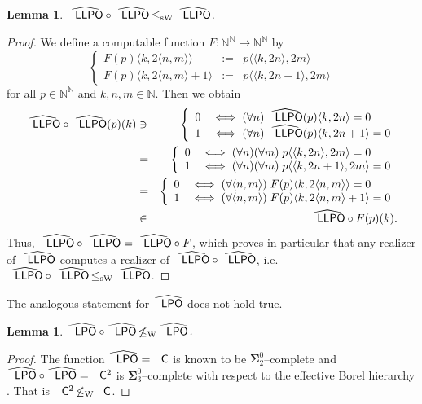 \documentclass[jsl,10pt]{noasl}
\def\IN{{\mathbb{N}}}
\newcommand{\SO}[1]{{{\boldsymbol\Sigma}^0_{#1}}}
\def\LPO{\text{\rm\sffamily LPO}}
\def\LLPO{\text{\rm\sffamily LLPO}}
\def\C{\text{\rm\sffamily C}}
\def\LPO{\text{\rm\sffamily LPO}}
\def\LLPO{\text{\rm\sffamily LLPO}}
\def\leqSW{\mathop{\leq_{\mathrm{sW}}}}
\def\nleqW{\mathop{\not\leq_{\mathrm{W}}}}
\newtheorem{lemma}[proposition]{Lemma}
\begin{document}
\begin{lemma} 
\label{lem:LLPO-double}
$\widehat{\LLPO}\circ\widehat{\LLPO}\leqSW\widehat{\LLPO}$.
\end{lemma}
\begin{proof}
We define a computable function $F:\IN^\IN\to\IN^\IN$ by
\[\left\{\begin{array}{lcl}
F(p)\langle k,2\langle n,m\rangle\rangle &:=& p\langle\langle k,2n\rangle,2m\rangle\\
F(p)\langle k,2\langle n,m\rangle+1\rangle &:=& p\langle\langle k,2n+1\rangle,2m\rangle
\end{array}\right.\]
for all $p\in\IN^\IN$ and $k,n,m\in\IN$. Then we obtain
\begin{eqnarray*}
\widehat{\LLPO}\circ\widehat{\LLPO}(p)(k)
&\ni& \left\{\begin{array}{ll}
    0 & \iff(\forall n)\;\widehat{\LLPO}(p)\langle k,2n\rangle=0\\
    1 & \iff(\forall n)\;\widehat{\LLPO}(p)\langle k,2n+1\rangle=0
    \end{array}\right.\\
&=& \left\{\begin{array}{ll}
    0 & \iff(\forall n)(\forall m)\;p\langle\langle k,2n\rangle,2m\rangle=0\\
    1 & \iff(\forall n)(\forall m)\;p\langle\langle k,2n+1\rangle,2m\rangle=0
    \end{array}\right.\\
&=& \left\{\begin{array}{ll}
    0 & \iff(\forall\langle n,m\rangle)\;F(p)\langle k,2\langle n,m\rangle\rangle=0\\
    1 & \iff(\forall\langle n,m\rangle)\;F(p)\langle k,2\langle n,m\rangle+1\rangle=0\\
    \end{array}\right.\\
&\in& \widehat{\LLPO}\circ F(p)(k).        
\end{eqnarray*}
Thus, $\widehat{\LLPO}\circ\widehat{\LLPO}=\widehat{\LLPO}\circ F$, which proves
in particular that any realizer of $\widehat{\LLPO}$ computes a realizer 
of $\widehat{\LLPO}\circ\widehat{\LLPO}$, i.e.\ $\widehat{\LLPO}\circ\widehat{\LLPO}\leqSW\widehat{\LLPO}$.
\end{proof}

The analogous statement for $\widehat{\LPO}$ does not hold true. 

\begin{lemma}
\label{lem:LPO-completeness}
$\widehat{\LPO}\circ\widehat{\LPO}\nleqW\widehat{\LPO}$.
\end{lemma}
\begin{proof}
The function $\widehat{\LPO}=\C$
is known to be $\SO{2}$--complete and $\widehat{\LPO}\circ\widehat{\LPO}=\C^2$ is $\SO{3}$--complete
with respect to the effective Borel hierarchy \cite{Bra05}. That is $\C^2\nleqW\C$.
\end{proof}
\end{document}
